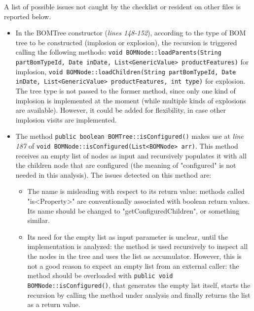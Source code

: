 A list of possible issues not caught by the checklist or resident on other files is reported below.
\begin{itemize}
	\item In the BOMTree constructor (\textit{lines 148-152}), according to the type of BOM tree to be constructed (implosion or explosion), the recursion is triggered calling the following methods:\newline
	\texttt{void BOMNode::loadParents(String partBomTypeId, Date inDate, List<GenericValue> productFeatures)} for implosion,\newline
	\texttt{void BOMNode::loadChildren(String partBomTypeId, Date inDate, List<GenericValue> productFeatures, int type)} for explosion.
	The tree type is not passed to the former method, since only one kind of implosion is implemented at the moment (while multiple kinds of explosions are available). However, it could be added for flexibility, in case other implosion visits are implemented.

	\item The method \texttt{public boolean BOMTree::isConfigured()} makes use at \textit{line 187} of \texttt{void BOMNode::isConfigured(List<BOMNode> arr)}. This method receives an empty list of nodes as input and recursively populates it with all the children node that are configured (the meaning of "configured" is not needed in this analysis). The issues detected on this method are:
		\begin{itemize}
			\item The name is misleading with respect to its return value: methods called "is\textless Property\textgreater" are conventionally associated with boolean return values. Its name should be changed to "getConfiguredChildren", or something similar.

			\item Its need for the empty list as input parameter is unclear, until the implementation is analyzed: the method is used recursively to inspect all the nodes in the tree and uses the list as accumulator. However, this is not a good reason to expect an empty list from an external caller: the method should be overloaded with
			\texttt{public void BOMNode::isConfigured()}, that generates the empty list itself, starts the recursion by calling the method under analysis and finally returns the list as a return value.
		\end{itemize}

\end{itemize}
